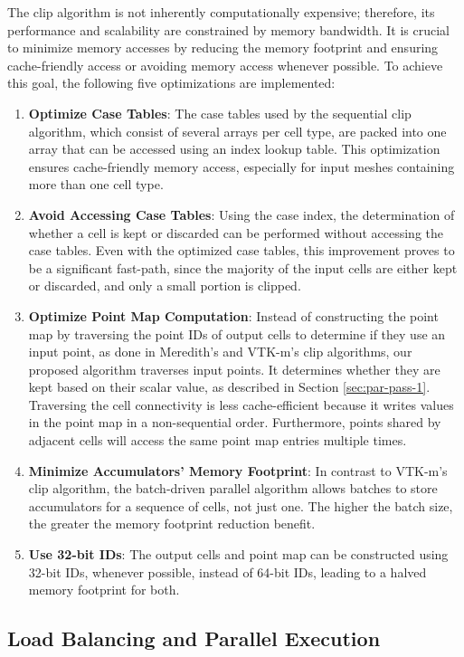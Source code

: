 \documentclass{egpubl}
\begin{document}
The clip algorithm is not inherently computationally expensive; therefore, its performance and scalability are constrained by memory bandwidth. It is crucial to minimize memory accesses by reducing the memory footprint and ensuring cache-friendly access or avoiding memory access whenever possible. To achieve this goal, the following five optimizations are implemented:

\begin{enumerate}
    \item \textbf{Optimize Case Tables}: The case tables used by the sequential clip algorithm, which consist of several arrays per cell type, are packed into one array that can be accessed using an index lookup table. This optimization ensures cache-friendly memory access, especially for input meshes containing more than one cell type. 
    \item \textbf{Avoid Accessing Case Tables}: Using the case index, the determination of whether a cell is kept or discarded can be performed without accessing the case tables. Even with the optimized case tables, this improvement proves to be a significant fast-path, since the majority of the input cells are either kept or discarded, and only a small portion is clipped.
    \item \textbf{Optimize Point Map Computation}: Instead of constructing the point map by traversing the point IDs of output cells to determine if they use an input point, as done in Meredith's and VTK-m's clip algorithms, our proposed algorithm traverses input points. It determines whether they are kept based on their scalar value, as described in Section \ref{sec:par-pass-1}. Traversing the cell connectivity is less cache-efficient because it writes values in the point map in a non-sequential order. Furthermore, points shared by adjacent cells will access the same point map entries multiple times.
    \item \textbf{Minimize Accumulators' Memory Footprint}: In contrast to VTK-m's clip algorithm, the batch-driven parallel algorithm allows batches to store accumulators for a sequence of cells, not just one. The higher the batch size, the greater the memory footprint reduction benefit.
    \item \textbf{Use 32-bit IDs}: The output cells and point map can be constructed using 32-bit IDs, whenever possible, instead of 64-bit IDs, leading to a halved memory footprint for both.
\end{enumerate}

\subsection{Load Balancing and Parallel Execution}
\label{sec:load-balancing-and-parallel-execution}
\end{document}
